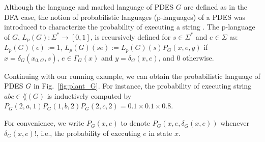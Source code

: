 Although the language and marked language of PDES $G$ are defined as in the DFA case, the notion of probabilistic languages (p-languages) of a PDES was introduced to characterize the probability of executing a string \citep{Garg:1999}.
The p-language of $G$, $L_p(G):\Sigma^*\rightarrow [0,1]$, is recursively defined for $s\in\Sigma^*$ and $e\in\Sigma$ as: 
$L_p(G)(\epsilon) := 1$, $L_p(G)(se) := L_p(G)(s)P_G(x,e,y)$ if $x=\delta_G(x_{0,G},s)$,  $e\in \Gamma_G(x)$ and $y = \delta_G(x,e)$, and $0$ otherwise.
\begin{example}  
Continuing with our running example, we can obtain the probabilistic language of PDES $G$ in Fig.~\ref{fig:plant_G}.
For instance, the probability of executing string $abc \in \lang(G)$ is inductively computed by $P_G(2,a,1)P_G(1,b,2)P_G(2,c,2) = 0.1\times 0.1\times 0.8$.
\end{example}

For convenience, we write $P_G(x,e)$ to denote $P_G(x,e,\delta_G(x,e))$ whenever $\delta_G(x,e)!$, i.e., the probability of executing $e$ in state $x$.


